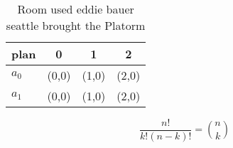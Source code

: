 \documentclass[a4paper]{article}
\begin{document}
\begin{table}
\begin{adjustbox}{width=0.6\columnwidth}
\begin{tabular}{|l|l|l|l|}
\hline
\textbf{plan} & \multicolumn{1}{c|}{\textbf{0}} & \multicolumn{1}{c|}{\textbf{1}} & \multicolumn{1}{c|}{\textbf{2}} \\ \hline
\textbf{$a_0$}  & (0,0) & (1,0) & (2,0) \\ \hline
\textbf{$a_1$}  & (0,0) & (1,0) & (2,0) \\ \hline
\end{tabular}
\end{adjustbox}
\caption{Room used eddie bauer seattle brought the Platorm
}
\end{table}

\[ \frac{n!}{k!(n-k)!} = \binom{n}{k} \]
\end{document}
